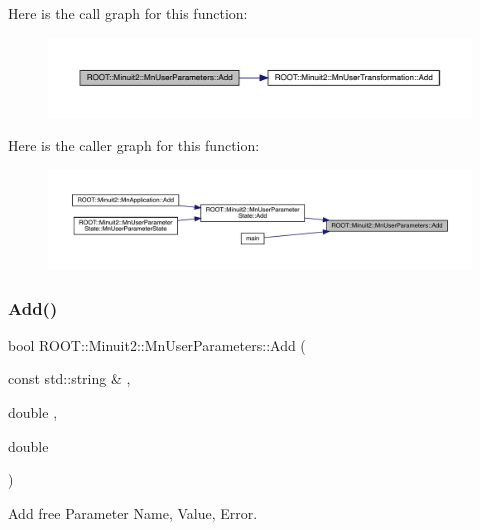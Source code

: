 Here is the call graph for this function\+:
\nopagebreak
\begin{figure}[H]
\begin{center}
\leavevmode
\includegraphics[width=350pt]{d6/d10/classROOT_1_1Minuit2_1_1MnUserParameters_a95405d43b783605dba2ead1ba3125ebc_cgraph}
\end{center}
\end{figure}
Here is the caller graph for this function\+:
\nopagebreak
\begin{figure}[H]
\begin{center}
\leavevmode
\includegraphics[width=350pt]{d6/d10/classROOT_1_1Minuit2_1_1MnUserParameters_a95405d43b783605dba2ead1ba3125ebc_icgraph}
\end{center}
\end{figure}
\mbox{\label{classROOT_1_1Minuit2_1_1MnUserParameters_a95405d43b783605dba2ead1ba3125ebc}} 
\subsubsection{\texorpdfstring{Add()}{Add()}\hspace{0.1cm}{\footnotesize\ttfamily [2/9]}}
{\footnotesize\ttfamily bool R\+O\+O\+T\+::\+Minuit2\+::\+Mn\+User\+Parameters\+::\+Add (\begin{DoxyParamCaption}\item[{const std\+::string \&}]{,  }\item[{double}]{,  }\item[{double}]{ }\end{DoxyParamCaption})}



Add free Parameter Name, Value, Error. 

